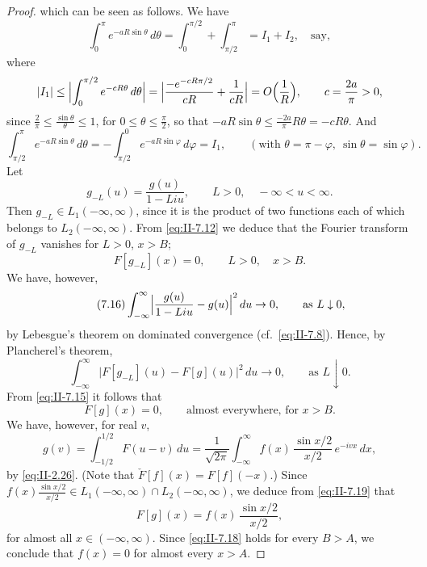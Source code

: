 \begin{proof}
which can be seen as follows. We have
\[
\int_{0}^{\pi}e^{-aR\sin\theta}\,d\theta
=\int_{0}^{\pi/2}+\int_{\pi/2}^{\pi}=I_{1}+I_{2},\quad\text{say},
\]
where
\[
|I_{1}|\le\Bigl|\int_{0}^{\pi/2}e^{-cR\theta}\,d\theta\Bigr|
=\Bigl|\frac{-e^{-cR\pi/2}}{cR}+\frac{1}{cR}\Bigr|
=O\Bigl(\frac{1}{R}\Bigr),\qquad c=\frac{2a}{\pi}>0,
\]
since $\frac{2}{\pi}\le\frac{\sin\theta}{\theta}\le 1$, for $0\le\theta\le\frac{\pi}{2}$, so that $-aR\sin\theta\le\frac{-2a}{\pi}R\theta=-cR\theta$. And
\[
\int_{\pi/2}^{\pi}e^{-aR\sin\theta}\,d\theta
=-\int_{\pi/2}^{0}e^{-aR\sin\varphi}\,d\varphi=I_{1},\qquad(\text{with }\theta=\pi-\varphi,\ \sin\theta=\sin\varphi).
\]
Let
\begin{equation}\tag{7.14}\label{eq:II-7.14}
g_{-L}(u)=\frac{g(u)}{1-Liu},\qquad L>0,\quad -\infty<u<\infty.
\end{equation}
Then $g_{-L}\in L_{1}(-\infty,\infty)$, since it is the product of two functions each of which belongs to $L_{2}(-\infty,\infty)$. From \eqref{eq:II-7.12} we deduce that the Fourier transform of $g_{-L}$ vanishes for $L>0$, $x>B$;
\begin{equation}\tag{7.15}\label{eq:II-7.15}
F[g_{-L}](x)=0,\qquad L>0,\quad x>B.
\end{equation}
We have, however,
\begin{equation}\tag{7.16}\label{eq:II-7.16}
\int_{-\infty}^{\infty}\Bigl|\frac{g(u)}{1-Liu}-g(u)\Bigr|^{2}\,du\to 0,\qquad\text{as }L\downarrow 0,
\end{equation}
by Lebesgue's theorem on dominated convergence (cf.\ \eqref{eq:II-7.8}). Hence, by Plancherel's theorem,
\begin{equation}\tag{7.17}\label{eq:II-7.17}
\int_{-\infty}^{\infty}\bigl|F[g_{-L}](u)-F[g](u)\bigr|^{2}\,du\to 0,\qquad\text{as }L\downarrow 0.
\end{equation}
From \eqref{eq:II-7.15} it follows that
\begin{equation}\tag{7.18}\label{eq:II-7.18}
F[g](x)=0,\qquad\text{almost everywhere, for }x>B.
\end{equation}
We have, however, for real $v$,
\begin{equation}\tag{7.19}\label{eq:II-7.19}
g(v)=\int_{-1/2}^{1/2}F(u-v)\,du
=\frac{1}{\sqrt{2\pi}}\int_{-\infty}^{\infty}f(x)\,\frac{\sin x/2}{x/2}\,e^{-ivx}\,dx,
\end{equation}
by \eqref{eq:II-2.26}. (Note that $\check F[f](x)=F[f](-x)$.) Since $f(x)\frac{\sin x/2}{x/2}\in L_{1}(-\infty,\infty)\cap L_{2}(-\infty,\infty)$, we deduce from \eqref{eq:II-7.19} that
\[
F[g](x)=f(x)\,\frac{\sin x/2}{x/2},
\]
for almost all $x\in(-\infty,\infty)$. Since \eqref{eq:II-7.18} holds for every $B>A$, we conclude that $f(x)=0$ for almost every $x>A$.


\end{proof}
